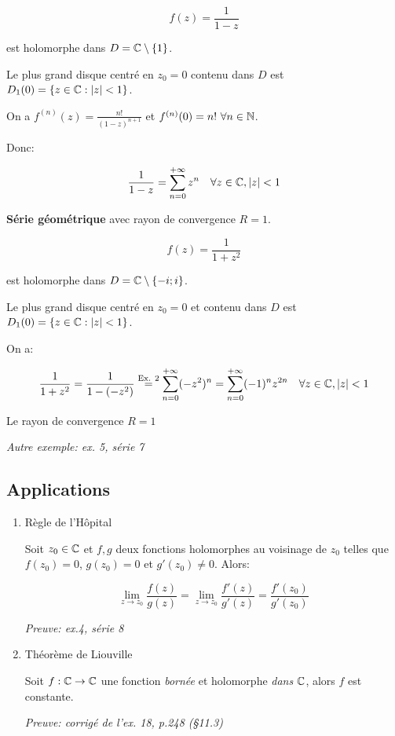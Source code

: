 \begin{example}[2]
    \[f(z) = \frac{1}{1-z}\]
    
     est holomorphe dans $D = \mathbb{C} \setminus \{1\}$.
    
    Le plus grand disque centré en $z_0 = 0$ contenu dans $D$ est $D_1(0) = \{ z \in \mathbb{C} : \left|z\right| < 1 \}$.
    
    On a $f^{(n)}(z) = \frac{n!}{(1-z)^{n+1}}$ et $f^{(n)}(0) = n! \ \forall n \in \mathbb{N}$.
    
    Donc:
    
    \[
    \frac{1}{1-z} = \sum_{n=0}^{+\infty} z^n \quad \forall z \in \mathbb{C}, \left|z\right| < 1
    \]
    
    \textbf{\og Série géométrique \fg{}} avec rayon de convergence $R = 1$.
\end{example}

\begin{example}[3]
    \[f(z) = \frac{1}{1 + z^2}\]
    
    est holomorphe dans $D = \mathbb{C} \setminus \{-i; i\}$.
    
    Le plus grand disque centré en $z_0 = 0$ et contenu dans $D$ est $D_1(0) = \{z \in \mathbb{C} : \left|z\right| < 1\}$.
    
    On a:
    
    \[
    \frac{1}{1 + z^2}
    = \frac{1}{1 - \left(-z^2\right)}
    \overset{\textrm{Ex. 2}}{=}
    \sum_{n=0}^{+\infty} (-z^2)^n
    = \sum_{n=0}^{+\infty} (-1)^n z^{2n} \quad \forall z \in \mathbb{C}, \left|z\right| < 1
    \]
    
    Le rayon de convergence $R = 1$
\end{example}

\textit{Autre exemple: ex. 5, série 7}

\subsection{Applications}

\begin{enumerate}[label=\arabic{enumi})]
    \item Règle de l'Hôpital
    
    Soit $z_0 \in \mathbb{C}$ et $f, g$ deux fonctions holomorphes au voisinage de $z_0$ telles que $f(z_0) = 0$, $g(z_0) = 0$ et $g'(z_0) \neq 0$.
    Alors:
    
    \[ \lim_{z \rightarrow z_0} \frac{f(z)}{g(z)} = \lim_{z \rightarrow z_0} \frac{f'(z)}{g'(z)} = \frac{f'(z_0)}{g'(z_0)} \]
    
    \textit{Preuve: ex.4, série 8}
    
    \item Théorème de Liouville
    
    Soit $f: \mathbb{C} \rightarrow \mathbb{C}$ une fonction \textit{bornée} et holomorphe \textit{dans} $\mathbb{C}$, alors $f$ est constante.
    
    \textit{Preuve: corrigé de l'ex. 18, p.248 (§11.3)}
\end{enumerate}


